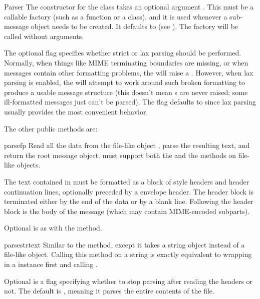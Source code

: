 \begin{classdesc}{Parser}{}
The constructor for the  class takes an optional
argument .  This must be a callable factory (such as a
function or a class), and it is used whenever a sub-message object
needs to be created.  It defaults to  (see
).  The factory will be called without
arguments.

The optional  flag specifies whether strict or lax parsing
should be performed.  Normally, when things like MIME terminating
boundaries are missing, or when messages contain other formatting
problems, the  will raise a
.  However, when lax parsing is enabled,
the  will attempt to work around such broken formatting
to produce a usable message structure (this doesn't mean
s are never raised; some ill-formatted
messages just can't be parsed).  The  flag defaults to
 since lax parsing usually provides the most convenient
behavior.

\end{classdesc}

The other public  methods are:

\begin{methoddesc}[Parser]{parse}{fp}
Read all the data from the file-like object , parse the
resulting text, and return the root message object.   must
support both the  and the  methods
on file-like objects.

The text contained in  must be formatted as a block of 
style headers and header continuation lines, optionally preceded by a
envelope header.  The header block is terminated either by the
end of the data or by a blank line.  Following the header block is the
body of the message (which may contain MIME-encoded subparts).

Optional  is as with the  method.

\end{methoddesc}

\begin{methoddesc}[Parser]{parsestr}{text}
Similar to the  method, except it takes a string
object instead of a file-like object.  Calling this method on a string
is exactly equivalent to wrapping  in a 
instance first and calling .

Optional  is a flag specifying whether to stop
parsing after reading the headers or not.  The default is ,
meaning it parses the entire contents of the file.

\end{methoddesc}

